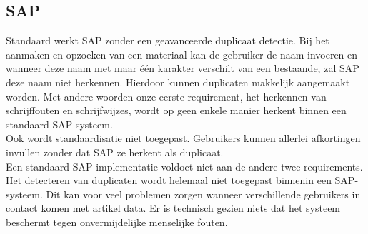 \subsection{SAP}
Standaard werkt SAP zonder een geavanceerde duplicaat detectie. Bij het aanmaken en opzoeken van een materiaal kan de gebruiker de naam invoeren en wanneer deze naam met maar één karakter verschilt van een bestaande, zal SAP deze naam niet herkennen. Hierdoor kunnen duplicaten makkelijk aangemaakt worden. Met andere woorden onze eerste requirement, het herkennen van schrijffouten en schrijfwijzes, wordt op geen enkele manier herkent binnen een standaard SAP-systeem.
\\Ook wordt standaardisatie niet toegepast. Gebruikers kunnen allerlei afkortingen invullen zonder dat SAP ze herkent als duplicaat. 
\\Een standaard SAP-implementatie voldoet niet aan de andere twee requirements. Het detecteren van duplicaten wordt helemaal niet toegepast binnenin een SAP-systeem. Dit kan voor veel problemen zorgen wanneer verschillende gebruikers in contact komen met artikel data. Er is technisch gezien niets dat het systeem beschermt tegen onvermijdelijke menselijke fouten.

